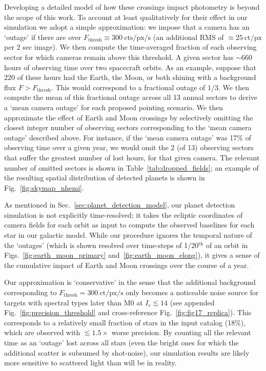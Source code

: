 Developing a detailed model of how these crossings impact \tesss photometry is beyond the scope of this work.
To account at least qualitatively for their effect in our simulation we adopt a simple approximation: we impose that a camera has an `outage' if there are over $F_\text{thresh}\equiv300\ \text{cts/px/s}$ (an additional RMS of $\approx 25\ \mathrm{ct/px}$ per 2 sec image).
We then compute the time-averaged fraction of each observing sector for which \tesss cameras remain above this threshold. 
A given sector has $\sim660$ hours of observing time over two spacecraft orbits.
As an example, suppose that $220$ of these hours had the Earth, the Moon, or both shining with a background flux $F > F_\text{thresh}$. 
This would correspond to a fractional outage of $1/3$. 
We then compute the mean of this fractional outage across all 13 annual sectors to derive a `mean camera outage' for each proposed pointing scenario.
We then approximate the effect of Earth and Moon crossings by selectively omitting the closest integer number of observing sectors corresponding to the `mean camera outage' described above.
For instance, if the `mean camera outage' was 17\% of \tesss observing time over a given year, we would omit the 2 (of 13) observing sectors that suffer the greatest number of lost hours, for that given camera.
The relevant number of omitted sectors is shown in Table~\ref{tab:dropped_fields}; an example of the resulting spatial distribution of detected planets is shown in Fig.~\ref{fig:skymap_nhemi}.


As mentioned in Sec.~\ref{sec:planet_detection_model}, our planet detection 
simulation is not explicitly time-resolved; it takes the ecliptic coordinates 
of camera fields for each orbit as input to compute the observed baselines for 
each star in our galactic model.
While our procedure ignores the temporal nature of the `outages' (which is 
shown resolved over time-steps of 1/20$^\mathrm{th}$ of an orbit in 
Figs.~\ref{fig:earth_moon_primary} and~\ref{fig:earth_moon_elong}), it gives a 
sense of the cumulative impact of Earth and Moon crossings over 
the course of a year.

Our approximation is `conservative' in the sense that the additional background 
corresponding to $F_\mathrm{thresh}=300\ \mathrm{ct/px/s}$ only becomes a 
noticeable noise source for targets with spectral types later than M0 at $I_c \lesssim 14$ (see 
appended Fig.~\ref{fig:precision_threshold} and cross-reference 
Fig.~\ref{fig:fig17_replica}).
This corresponds to a relatively small fraction of stars in the input catalog (18\%), which are observed with $\lesssim\! 1.5\times$ worse precision.
By counting all the relevant time as an `outage' lost across all stars (even 
the bright ones for which the additional scatter is subsumed by shot-noise), our simulation results are likely more sensitive to scattered light than \tess will be in reality.

